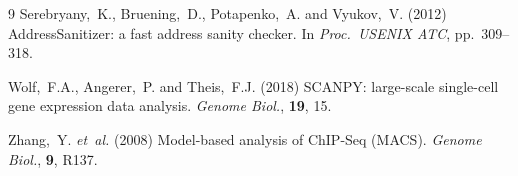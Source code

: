 \documentclass[10pt,twocolumn]{article}
\begin{document}
\begin{thebibliography}{9}
Serebryany,~K., Bruening,~D., Potapenko,~A. and Vyukov,~V. (2012)
AddressSanitizer: a fast address sanity checker.
In \textit{Proc.\ USENIX ATC}, pp.\ 309--318.

Wolf,~F.A., Angerer,~P. and Theis,~F.J. (2018)
SCANPY: large-scale single-cell gene expression data analysis.
\textit{Genome Biol.}, \textbf{19}, 15.

Zhang,~Y. \textit{et~al.} (2008)
Model-based analysis of ChIP-Seq (MACS).
\textit{Genome Biol.}, \textbf{9}, R137.

\end{thebibliography}
\end{document}

